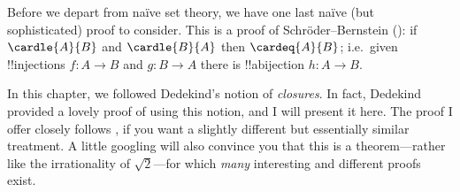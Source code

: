 \documentclass[../../../include/open-logic-section]{subfiles}
\begin{document}
Before we depart from na\"ive set theory, we have one last na\"ive (but sophisticated\bang) proof to consider. This is a proof of Schr\"oder--Bernstein (): if $\cardle{A}{B}$ and $\cardle{B}{A}$ then $\cardeq{A}{B}$; i.e.\ given !!{injection}s $f \colon A \to B$ and $g \colon B \to A$ there is !!a{bijection} $h \colon A \to B$. 

In this chapter, we followed Dedekind's notion of \emph{closures}. In fact, Dedekind provided a lovely proof of   using this notion, and I will present it here. The proof I offer closely follows \citet[157--8]{Potter2004}, if you want a slightly different but essentially similar treatment. A little googling will also convince you that this is a theorem---rather like the irrationality of $\sqrt{2}$---for which \emph{many} interesting and different proofs exist.
\end{document}
